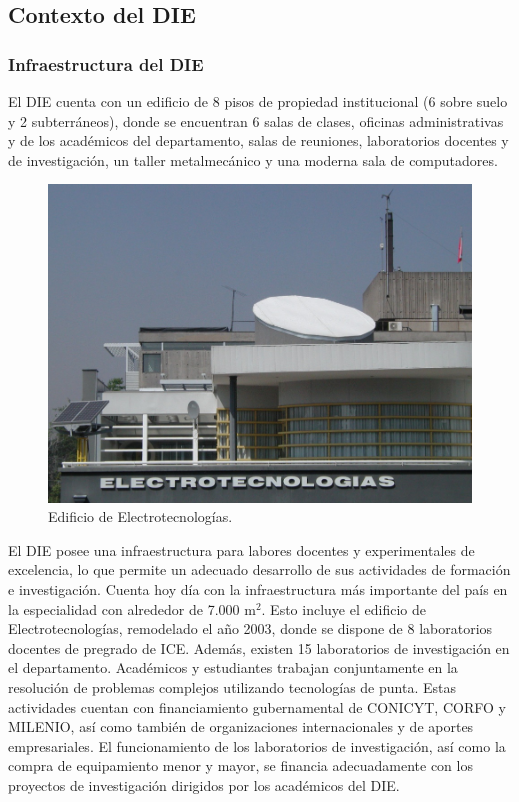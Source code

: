 \subsection{Contexto del DIE}

\subsubsection{Infraestructura del DIE}

El DIE cuenta con un edificio de 8 pisos de propiedad institucional (6 sobre suelo y 2
subterráneos), donde se encuentran 6 salas de clases, oficinas administrativas y de los académicos
del departamento, salas de reuniones, laboratorios docentes y de investigación, un taller metalmecánico y una moderna sala de computadores.

\begin{figure}[ht!]
\centering
\includegraphics[width=\columnwidth]{./pictures/electrotecnologias.png}
\caption{Edificio de Electrotecnologías.}
\label{edif_ET}
\end{figure}

El DIE posee una infraestructura para labores docentes y experimentales de excelencia, lo
que permite un adecuado desarrollo de sus actividades de formación e investigación. Cuenta
hoy día con la infraestructura más importante del país en la especialidad con alrededor de
7.000 m$^2$. Esto incluye el edificio de Electrotecnologías, remodelado el año 2003, donde
se dispone de 8 laboratorios docentes de pregrado de ICE. Además, existen 15 laboratorios
de investigación en el departamento. Académicos y estudiantes trabajan conjuntamente en la
resolución de problemas complejos utilizando tecnologías de punta. Estas actividades cuentan
con financiamiento gubernamental de CONICYT, CORFO y MILENIO, así como también de
organizaciones internacionales y de aportes empresariales. El funcionamiento de los laboratorios
de investigación, así como la compra de equipamiento menor y mayor, se financia adecuadamente
con los proyectos de investigación dirigidos por los académicos del DIE.

